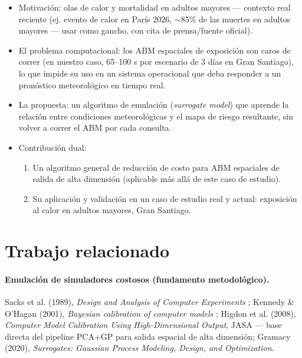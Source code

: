 \documentclass[11pt,a4paper]{article}
\begin{document}
\begin{itemize}[leftmargin=*]
    \item Motivación: olas de calor y mortalidad en adultos mayores ---
        contexto real reciente (ej. evento de calor en París 2026,
        $\sim$85\% de las muertes en adultos mayores --- usar como gancho,
        con cita de prensa/fuente oficial).
    \item El problema computacional: los ABM espaciales de exposición son
        caros de correr (en nuestro caso, 65--100 s por escenario de 3 días
        en Gran Santiago), lo que impide su uso en un sistema operacional
        que deba responder a un pronóstico meteorológico en tiempo real.
    \item La propuesta: un algoritmo de emulación (\emph{surrogate model})
        que aprende la relación entre condiciones meteorológicas y el mapa
        de riesgo resultante, sin volver a correr el ABM por cada consulta.
    \item Contribución dual:
    \begin{enumerate}
        \item Un algoritmo general de reducción de costo para ABM espaciales
            de salida de alta dimensión (aplicable más allá de este caso de
            estudio).
        \item Su aplicación y validación en un caso de estudio real y
            actual: exposición al calor en adultos mayores, Gran Santiago.
    \end{enumerate}
\end{itemize}

\section{Trabajo relacionado}

\paragraph{Emulación de simuladores costosos (fundamento metodológico).}
Sacks et al. (1989), \emph{Design and Analysis of Computer Experiments}
; Kennedy \& O'Hagan
(2001), \emph{Bayesian calibration of computer models}
; Higdon et al. (2008),
\emph{Computer Model Calibration Using High-Dimensional Output}, JASA ---
base directa del pipeline PCA+GP para salida espacial de alta dimensión;
Gramacy (2020), \emph{Surrogates: Gaussian Process Modeling, Design, and
Optimization}.
\end{document}
